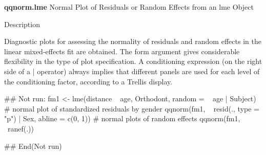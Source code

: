 \textbf{qqnorm.lme}
Normal Plot of Residuals or Random Effects from an lme Object

Description

Diagnostic plots for assessing the normality of residuals and random effects in the linear mixed-effects fit are obtained. 
The form argument gives considerable flexibility in the type of plot specification. 
A conditioning expression (on the right side of a | operator) always implies that different panels are used 
for each level of the conditioning factor, according to a Trellis display.

## Not run: 
fm1 <- lme(distance ~ age, Orthodont, random = ~ age | Subject)
# normal plot of standardized residuals by gender
qqnorm(fm1, ~ resid(., type = "p") | Sex, abline = c(0, 1))
# normal plots of random effects
qqnorm(fm1, ~ranef(.))

## End(Not run)
